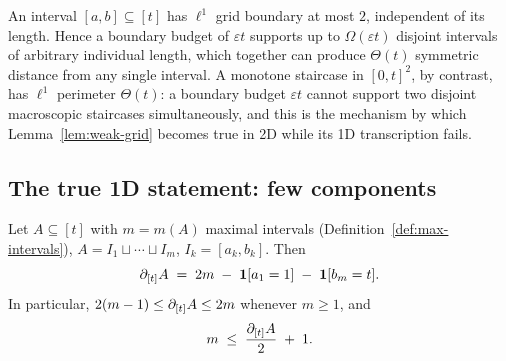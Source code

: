 \begin{remark}\label{rem:1d-vs-2d}
An interval $[a,b] \subseteq [t]$ has $\ell^1$ grid boundary at most
$2$, independent of its length. Hence a boundary budget of
$\varepsilon t$ supports up to $\Omega(\varepsilon t)$ disjoint
intervals of arbitrary individual length, which together can produce
$\Theta(t)$ symmetric distance from any single interval. A monotone
staircase in $[0,t]^2$, by contrast, has $\ell^1$ perimeter
$\Theta(t)$: a boundary budget $\varepsilon t$ cannot support two
disjoint macroscopic staircases simultaneously, and this is the
mechanism by which Lemma~\ref{lem:weak-grid} becomes true in 2D while
its 1D transcription fails.
\end{remark}

\subsection{The true 1D statement: few components}

\begin{lemma}\label{lem:1d-components}
Let $A \subseteq [t]$ with $m = m(A)$ maximal intervals
(Definition~\ref{def:max-intervals}), $A = I_1 \sqcup \cdots \sqcup
I_m$, $I_k = [a_k, b_k]$. Then
\[
\partial_{[t]} A \;=\; 2m \;-\; \mathbf{1}[a_1 = 1] \;-\; \mathbf{1}[b_m = t].
\]
In particular, $2(m-1) \le \partial_{[t]} A \le 2m$ whenever $m \ge 1$, and
\[
m \;\le\; \frac{\partial_{[t]} A}{2} \;+\; 1.
\]
\end{lemma}


